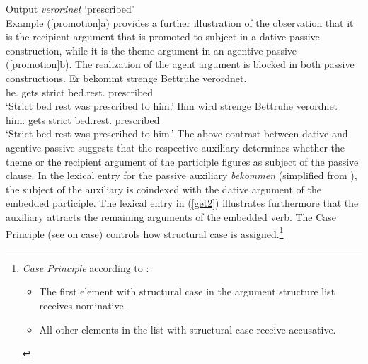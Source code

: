 \documentclass[output=paper
                ,modfonts
                ,nonflat
	        ,collection
	        ,collectionchapter
	        ,collectiontoclongg
 	        ,biblatex
                ,babelshorthands
                ,newtxmath
                ,draftmode
                ,colorlinks, citecolor=brown
]{./langsci/langscibook}
\begin{document}
\ea \label{verordnet-passive}
Output \textit{verordnet} `prescribed' \\
\z 
Example (\ref{promotion}a) provides a further illustration of the observation that it is the recipient argument that is promoted to subject in a dative passive construction, while it is the theme argument in an agentive passive (\ref{promotion}b). The realization of the agent argument is blocked in both passive constructions. 
\eal \label{promotion}
\ex
\gll Er bekommt strenge Bettruhe verordnet. \\ he.\nom {} gets strict bed.rest.\acc {} prescribed \\
\glt `Strict bed rest was prescribed to him.'
\ex
\gll Ihm wird strenge Bettruhe verordnet \\ him.\dat {} gets strict bed.rest.\nom {} prescribed \\
\glt  `Strict bed rest was prescribed to him.'
\zl
The above contrast between dative and agentive passive suggests that the respective auxiliary
determines whether the theme or the recipient argument of the participle figures as subject of the
passive clause. In the lexical entry for the passive auxiliary \textit{bekommen} (simplified from
\cite[313]{mueller2013}), the subject of the auxiliary is coindexed with the dative argument of the
embedded participle. The lexical entry in (\ref{get2}) illustrates furthermore that the auxiliary
attracts the remaining arguments of the embedded verb. The Case Principle (see 
on case) controls how structural case is assigned.\footnote{\emph{Case Principle} according to \cite[287]{mueller2018}:
\begin{itemize}
\setlength{\itemsep}{0pt}
\item The first element with structural case in the argument structure list receives nominative.
\item All other elements in the list with structural case receive accusative.
\end{itemize}}
\end{document}

